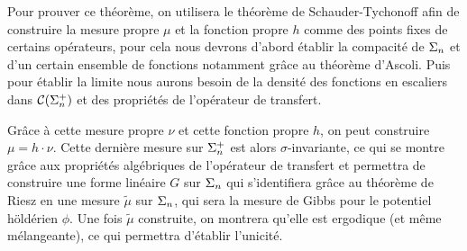   Pour prouver ce théorème, on utilisera le théorème de Schauder-Tychonoff afin de construire la mesure propre $\mu$
  et la fonction propre $h$ comme des points fixes de certains opérateurs, pour cela nous devrons d'abord établir la compacité de $\s_n$
  et d'un certain ensemble de fonctions notamment grâce au théorème d'Ascoli.
  Puis pour établir la limite nous aurons besoin de la densité des fonctions en escaliers dans $\Csp{n}$ et des propriétés de l'opérateur de transfert.

  Grâce à cette mesure propre $\nu$ et cette fonction propre $h$, on peut construire $\mu = h \cdot \nu$.
  Cette dernière mesure sur $\sp_n$ est alors $\sigma$-invariante, ce qui se montre grâce aux propriétés algébriques de l'opérateur de transfert et
  permettra de construire une forme linéaire $G$ sur $\s_n$ qui s'identifiera grâce au théorème de Riesz en une mesure $\tilde\mu$ sur $\s_n$,
  qui sera la mesure de Gibbs pour le potentiel höldérien $\phi$.
  Une fois $\tilde\mu$ construite, on montrera qu'elle est ergodique (et même mélangeante), ce qui permettra d'établir l'unicité.

